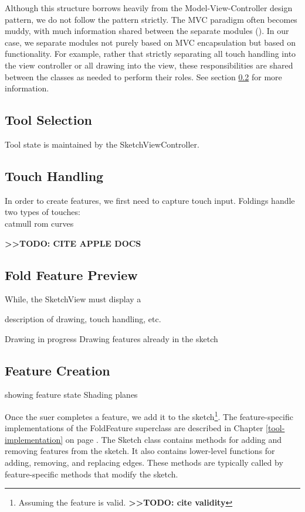 Although this structure borrows heavily from the Model-View-Controller
design pattern, we do not follow the pattern strictly. The MVC paradigm
often becomes muddy, with much information shared between the separate
modules (\citet{veit2003model}). In our case, we separate modules not
purely based on MVC encapsulation but based on functionality. For
example, rather that strictly separating all touch handling into the
view controller or all drawing into the view, these responsibilities are
shared between the classes as needed to perform their roles. See section
\ref{touch-handling} for more information.

\subsection{Tool Selection}\label{tool-selection}

Tool state is maintained by the SketchViewController.

\subsection{Touch Handling}\label{touch-handling}

In order to create features, we first need to capture touch input.
Foldings handle two types of touches:\\catmull rom curves

\textbf{\textgreater{}\textgreater{}TODO: CITE APPLE DOCS}

\subsection{Fold Feature Preview}\label{fold-feature-preview}

While, the SketchView must display a

description of drawing, touch handling, etc.

Drawing in progress Drawing features already in the sketch

\subsection{Feature Creation}\label{feature-creation}

showing feature state Shading planes

Once the suer completes a feature, we add it to the sketch\footnote{Assuming
  the feature is valid. \textbf{\textgreater{}\textgreater{}TODO: cite
  validity}}. The feature-specific implementations of the FoldFeature
superclass are described in Chapter \ref{tool-implementation} on page
\pageref{tool-implementation}. The Sketch class contains methods for
adding and removing features from the sketch. It also contains
lower-level functions for adding, removing, and replacing edges. These
methods are typically called by feature-specific methods that modify the
sketch.
